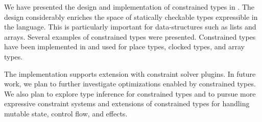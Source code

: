 %
%
%
%

We have presented the design and implementation of 
constrained types in \Xten{}.
The design considerably enriches the space of
statically checkable types expressible in the language. This is
particularly important for data-structures such as lists and arrays.
Several examples of constrained types were presented.
Constrained types have been implemented in \Xten{}
and used for place types, clocked types, and array types.

The implementation supports extension with constraint solver plugins.
In future work,
we plan to further investigate
optimizations enabled by constrained types.
We also plan to explore type inference for constrained types
and to pursue more expressive constraint systems and
extensions of constrained types for handling mutable state,
control flow, and effects.
